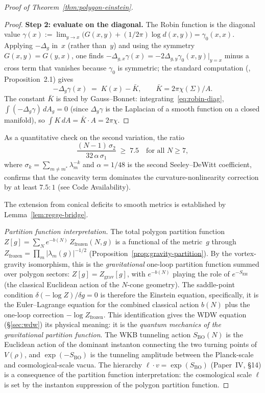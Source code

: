 \begin{proof}[Proof of Theorem~\ref{thm:polygon-einstein}]
\begin{proof}
\textbf{Step 2: evaluate on the diagonal.}
The Robin function is the diagonal value
$\gamma(x) := \lim_{y \to x}\bigl(G(x, y) +
(1/2\pi)\log d(x, y)\bigr) = \gamma_0(x, x)$.
Applying $-\Delta_g$ in~$x$ (rather than~$y$) and using the
symmetry $G(x,y) = G(y,x)$, one finds $-\Delta_{g,x}\gamma(x)
= -2\Delta_{g,y}\gamma_0(x,y)|_{y=x}$
minus a cross term that vanishes because $\gamma_0$ is
symmetric; the standard computation
(\citealt{Okikiolu2008}, Proposition~2.1) gives
\begin{equation}\label{eq:robin-diag}
  -\Delta_g\gamma(x) \;=\; K(x) - \bar K,
  \qquad \bar K = 2\pi\chi(\Sigma)/A.
\end{equation}
The constant $\bar K$ is fixed by Gauss--Bonnet:
integrating~\eqref{eq:robin-diag},
$\int (-\Delta_g\gamma)\,dA_g = 0$ (since $\Delta_g\gamma$ is
the Laplacian of a smooth function on a closed manifold),
so $\int K\,dA = \bar K \cdot A = 2\pi\chi$.
\end{proof}
As a quantitative check on the second variation,
the ratio
\begin{equation}\label{eq:concavity-ratio}
  \frac{(N{-}1)\,\sigma_2}{32\,\alpha\,\sigma_1}
  \;\ge\; 7.5
  \quad\text{for all } N \ge 7,
\end{equation}
where $\sigma_k = \sum_{m \ne m^*}\lambda_m^{-k}$
and $\alpha = 1/48$ is the second Seeley--DeWitt
coefficient,
confirms that the concavity term dominates the
curvature-nonlinearity correction by at least $7.5:1$
(see Code Availability).

The extension from conical deficits to smooth metrics
is established by Lemma~\ref{lem:regge-bridge}.

\medskip
\noindent\emph{Partition function interpretation.}
The total polygon partition function
$Z[g] = \sum_N e^{-b(N)}\,Z_{\mathrm{frozen}}(N, g)$
is a functional of the metric~$g$ through
$Z_{\mathrm{frozen}} = \prod_m |\lambda_m(g)|^{-1/2}$
(Proposition~\ref{prop:gravity-partition}).
By the vortex-gravity isomorphism, this is the
\emph{gravitational} one-loop partition function summed
over polygon sectors: $Z[g] = Z_{\mathrm{grav}}[g]$,
with $e^{-b(N)}$ playing the role of $e^{-S_{\mathrm{EH}}}$
(the classical Euclidean action of the $N$-cone geometry).
The saddle-point condition $\delta(-\log Z)/\delta g = 0$ is
therefore the Einstein equation, specifically, it is the
Euler--Lagrange equation for the combined classical action
$b(N)$ plus the one-loop correction $-\log Z_{\mathrm{frozen}}$.
This identification gives the WDW equation
(\S\ref{sec:wdw}) its physical meaning: it is the
\emph{quantum mechanics of the gravitational partition function}.
The WKB tunneling action $S_{\mathrm{BO}}(N)$ is the
Euclidean action of the dominant instanton connecting the
two turning points of $V(\rho)$, and $\exp(-S_{\mathrm{BO}})$
is the tunneling amplitude between the Planck-scale and
cosmological-scale vacua.
The hierarchy $\ell \cdot v = \exp(S_{\mathrm{BO}})$
(Paper~IV, \S14) is a consequence of the partition function
interpretation: the cosmological scale $\ell$ is set by
the instanton suppression of the polygon partition function.


\end{proof}
